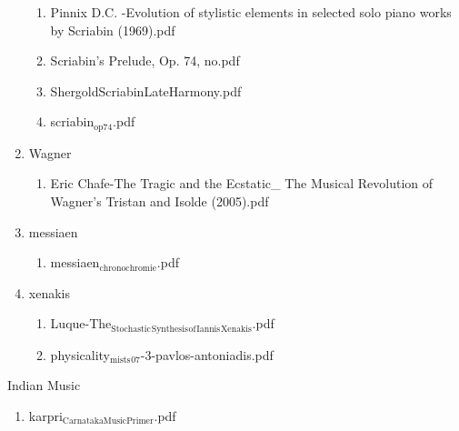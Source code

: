 \documentclass[11pt]{article}
\begin{document}
\begin{enumerate}
\begin{enumerate}
\item Pinnix D.C. -Evolution of stylistic elements in selected solo piano works by Scriabin (1969).pdf
\label{sec-1-1-1-1-31-7-16-2}

\item Scriabin's Prelude, Op. 74, no.pdf
\label{sec-1-1-1-1-31-7-16-3}

\item ShergoldScriabinLateHarmony.pdf
\label{sec-1-1-1-1-31-7-16-4}

\item scriabin$_{\text{op74}}$.pdf
\label{sec-1-1-1-1-31-7-16-5}
\end{enumerate}

\item Wagner
\label{sec-1-1-1-1-31-7-17}
\begin{enumerate}
\item Eric Chafe-The Tragic and the Ecstatic\_ The Musical Revolution of Wagner's Tristan and Isolde (2005).pdf
\label{sec-1-1-1-1-31-7-17-1}
\end{enumerate}

\item messiaen
\label{sec-1-1-1-1-31-7-18}
\begin{enumerate}
\item messiaen$_{\text{chronochromie}}$.pdf
\label{sec-1-1-1-1-31-7-18-1}
\end{enumerate}

\item xenakis
\label{sec-1-1-1-1-31-7-19}
\begin{enumerate}
\item Luque-The$_{\text{Stochastic}}$$_{\text{Synthesis}}$$_{\text{of}}$$_{\text{Iannis}}$$_{\text{Xenakis}}$.pdf
\label{sec-1-1-1-1-31-7-19-1}

\item physicality$_{\text{mists}}$$_{\text{07}}$-3-pavlos-antoniadis.pdf
\label{sec-1-1-1-1-31-7-19-2}
\end{enumerate}
\end{enumerate}

\item Indian Music
\label{sec-1-1-1-1-31-8}
\begin{enumerate}
\item karpri$_{\text{CarnatakaMusicPrimer}}$.pdf
\label{sec-1-1-1-1-31-8-1}
\end{enumerate}
\end{document}
